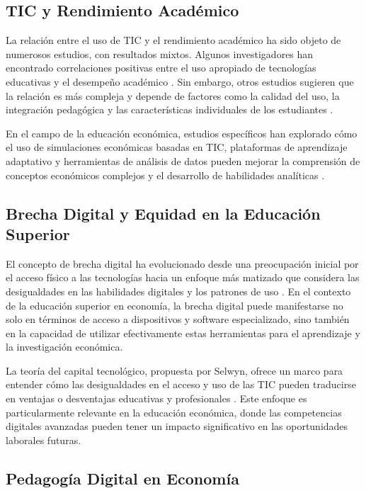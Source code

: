 \documentclass[12pt, a4paper]{article}
\begin{document}
\subsection{TIC y Rendimiento Académico}

La relación entre el uso de TIC y el rendimiento académico ha sido objeto de numerosos estudios, con resultados mixtos. Algunos investigadores han encontrado correlaciones positivas entre el uso apropiado de tecnologías educativas y el desempeño académico \parencite{Rodríguez2017}. Sin embargo, otros estudios sugieren que la relación es más compleja y depende de factores como la calidad del uso, la integración pedagógica y las características individuales de los estudiantes \parencite{Bulman2016}.

En el campo de la educación económica, estudios específicos han explorado cómo el uso de simulaciones económicas basadas en TIC, plataformas de aprendizaje adaptativo y herramientas de análisis de datos pueden mejorar la comprensión de conceptos económicos complejos y el desarrollo de habilidades analíticas \parencite{Jang2018}.

\subsection{Brecha Digital y Equidad en la Educación Superior}

El concepto de brecha digital ha evolucionado desde una preocupación inicial por el acceso físico a las tecnologías hacia un enfoque más matizado que considera las desigualdades en las habilidades digitales y los patrones de uso \parencite{VanDijk2020}. En el contexto de la educación superior en economía, la brecha digital puede manifestarse no solo en términos de acceso a dispositivos y software especializado, sino también en la capacidad de utilizar efectivamente estas herramientas para el aprendizaje y la investigación económica.

La teoría del capital tecnológico, propuesta por Selwyn, ofrece un marco para entender cómo las desigualdades en el acceso y uso de las TIC pueden traducirse en ventajas o desventajas educativas y profesionales \parencite{Selwyn2004}. Este enfoque es particularmente relevante en la educación económica, donde las competencias digitales avanzadas pueden tener un impacto significativo en las oportunidades laborales futuras.

\subsection{Pedagogía Digital en Economía}
\end{document}
